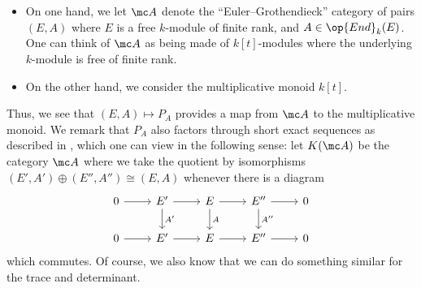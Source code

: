 \documentclass[../notes.tex]{subfiles}
\begin{document}
\begin{itemize}
	\item On one hand, we let $\mc A$ denote the ``Euler--Grothendieck'' category of pairs $(E,A)$ where $E$ is a free $k$-module of finite rank, and $A\in\op{End}_k(E)$. One can think of $\mc A$ as being made of $k[t]$-modules where the underlying $k$-module is free of finite rank.
	\item On the other hand, we consider the multiplicative monoid $k[t]$.
\end{itemize}
Thus, we see that $(E,A)\mapsto P_A$ provides a map from $\mc A$ to the multiplicative monoid. We remark that $P_A$ also factors through short exact sequences as described in , which one can view in the following sense: let $K(\mc A)$ be the category $\mc A$ where we take the quotient by isomorphisms $(E',A')\oplus(E'',A'')\cong(E,A)$ whenever there is a diagram
\[\begin{tikzcd}
	0 & {E'} & E & {E''} & 0 \\
	0 & {E'} & E & {E''} & 0
	\arrow[from=1-1, to=1-2]
	\arrow[from=1-2, to=1-3]
	\arrow["{A'}", from=1-2, to=2-2]
	\arrow[from=1-3, to=1-4]
	\arrow["A", from=1-3, to=2-3]
	\arrow[from=1-4, to=1-5]
	\arrow["{A''}", from=1-4, to=2-4]
	\arrow[from=2-1, to=2-2]
	\arrow[from=2-2, to=2-3]
	\arrow[from=2-3, to=2-4]
	\arrow[from=2-4, to=2-5]
\end{tikzcd}\]
which commutes. Of course, we also know that we can do something similar for the trace and determinant.
\end{document}
